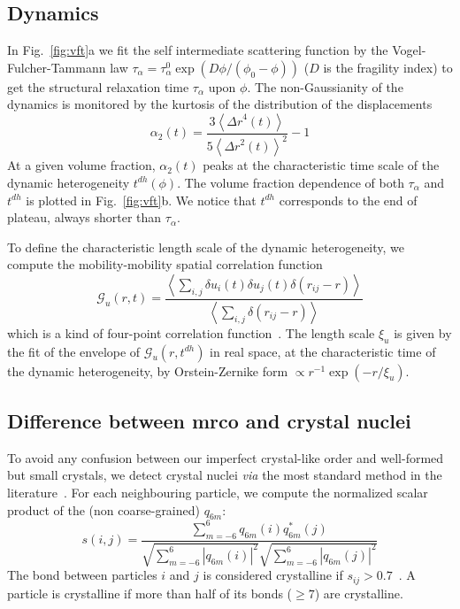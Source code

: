 \subsection*{Dynamics}

In Fig.~\ref{fig:vft}a we fit the self intermediate scattering function by the Vogel-Fulcher-Tammann law $\tau_\alpha=\tau_\alpha^0 \exp(D\phi/(\phi_0-\phi))$ ($D$ is the fragility index) to get the structural relaxation time $\tau_\alpha$ upon $\phi$. The non-Gaussianity of the dynamics is monitored by the kurtosis of the distribution of the displacements 
\begin{equation}
	\alpha_2(t) = \frac{3 \left\langle {\Delta r}^4(t) \right\rangle}{5 {\left\langle {\Delta r}^2(t) \right\rangle}^2}-1
	\label{eq:ng}
\end{equation}
At a given volume fraction, $\alpha_2(t)$ peaks at the characteristic time scale of the dynamic heterogeneity $t^{dh}(\phi)$. The volume fraction dependence of both $\tau_\alpha$ and $t^{dh}$ is plotted in Fig.~\ref{fig:vft}b. We notice that $t^{dh}$ corresponds to the end of plateau, always shorter than $\tau_\alpha$.

To define the characteristic length scale of the dynamic heterogeneity, we compute the mobility-mobility spatial correlation function~\cite{Donati1999}
\begin{equation}
	\mathcal{G}_u(r,t) = \frac{
		\left\langle \sum_{i,j}{\delta u_i(t) \delta u_j(t) \delta(r_{ij} -r)} \right\rangle 
	}{
		\left\langle \sum_{i,j}{\delta(r_{ij} -r)} \right\rangle
	}
	\label{eq:mobility_correl}
\end{equation}
which is a kind of four-point correlation function~\cite{cavagna2009supercooled}. The length scale $\xi_u$ is given by the fit of the envelope of $\mathcal{G}_u(r,t^{dh})$ in real space, at the characteristic time of the dynamic heterogeneity, by Orstein-Zernike form $\propto r^{-1}\exp( -r/\xi_u)$.

\subsection*{Difference between {\sc mrco} and crystal nuclei}

To avoid any confusion between our imperfect crystal-like order and well-formed but small crystals, we detect crystal nuclei \emph{via} the most standard method in the literature~\cite{ReintenWolde1996, Zaccarelli2009}. For each neighbouring particle, we compute the normalized scalar product of the (non coarse-grained) $q_{6 m}$:
\begin{equation}
	s(i,j) = \frac{
		\sum_{m=-6}^{6} q_{6 m}(i) q_{6 m}^{*}(j)
	}{
		\sqrt{\sum_{m=-6}^{6} |q_{6 m}(i)|^2} \sqrt{\sum_{m=-6}^{6} |q_{6 m}(j)|^2}
	}
	\label{eq:boo_dot_product}
\end{equation}
The bond between particles $i$ and $j$ is considered crystalline if $s_{ij}>0.7$~\cite{Zaccarelli2009}. A particle is crystalline if more than half of its bonds ($\geq 7$) are crystalline. 

